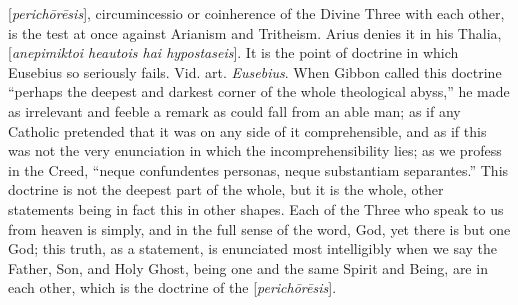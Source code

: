 
[\emph{perich\={o}r\={e}sis}],
circumincessio or coinherence of the Divine Three with each other, is
the test at once against Arianism and Tritheism. Arius denies it in
his Thalia, [\emph{anepimiktoi heautois hai hypostaseis}].
It is the point of doctrine in which Eusebius so seriously
fails. Vid. art. \emph{Eusebius}.
When Gibbon called this doctrine ``perhaps the deepest and
darkest corner of the whole theological abyss,'' he made as irrelevant
and feeble a remark as could fall from an able man; as if any Catholic
pretended that it was on any side of it comprehensible, and as if this
was not the very enunciation in which the incomprehensibility lies; as
we profess in the Creed, ``neque confundentes personas, neque
substantiam separantes.'' This doctrine is not the deepest part of the
whole, but it is the whole, other statements being in fact this in
other shapes. Each of the Three who speak to us from heaven is simply,
and in the full sense of the word, God, yet there is but one God; this
truth, as a statement, is enunciated most intelligibly when we say the
Father, Son, and Holy Ghost, being one and the same Spirit and Being,
are in each other, which is the doctrine of the [\emph{perich\={o}r\={e}sis}].


